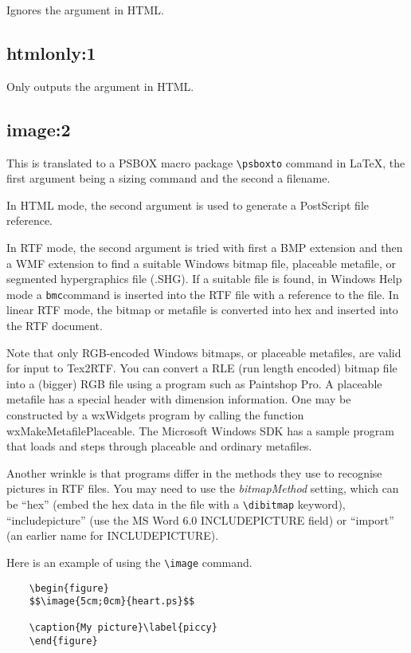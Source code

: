 Ignores the argument in HTML.

\subsection*{htmlonly:1}\label{htmlonly}

Only outputs the argument in HTML.

\subsection*{image:2}\label{image}

This is translated to a PSBOX macro package \verb$\psboxto$ command in \LaTeX,
the first argument being a sizing command and the second a filename.

In HTML mode, the second argument is used to generate a PostScript file reference.

In RTF mode, the second argument is tried with first a BMP extension and
then a WMF extension to find a suitable Windows bitmap file, placeable
metafile, or segmented hypergraphics file (.SHG). If a suitable file is
found, in Windows Help mode a {\tt bmc}\rtfsp command is inserted into
the RTF file with a reference to the file. In linear RTF mode, the
bitmap or metafile is converted into hex and inserted into the RTF
document.

Note that only RGB-encoded Windows bitmaps, or placeable metafiles, are
valid for input to Tex2RTF. You can convert a RLE (run length encoded)
bitmap file into a (bigger) RGB file using a program such as Paintshop
Pro. A placeable metafile has a special header with dimension
information. One may be constructed by a wxWidgets program by calling
the function wxMakeMetafilePlaceable. The Microsoft Windows SDK has a
sample program that loads and steps through placeable and ordinary
metafiles.

Another wrinkle is that programs differ in the methods they
use to recognise pictures in RTF files. You may need to use the {\it bitmapMethod} setting,
which can be ``hex'' (embed the hex data in the file with a \verb$\dibitmap$ keyword),
``includepicture'' (use the MS Word 6.0 INCLUDEPICTURE field) or ``import''
(an earlier name for INCLUDEPICTURE).

Here is an example of using the \verb$\image$ command.

\begin{verbatim}
    \begin{figure}
    $$\image{5cm;0cm}{heart.ps}$$

    \caption{My picture}\label{piccy}
    \end{figure}
\end{verbatim}


